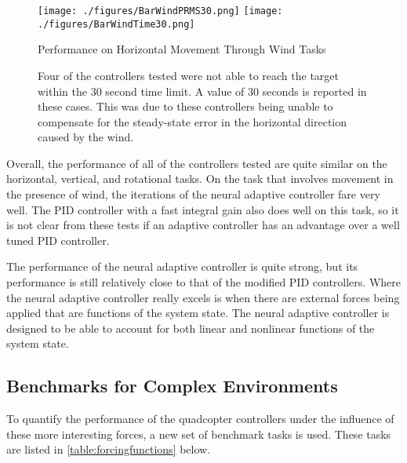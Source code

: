 \documentclass[letterpaper,12pt,titlepage,oneside,final]{book}
\begin{document}
\begin{figure}
\centering
\texttt{[image: ./figures/BarWindPRMS30.png]}
\texttt{[image: ./figures/BarWindTime30.png]}
\caption{Performance on Horizontal Movement Through Wind Tasks}\label{fig:bar_wind}
\captionsetup{singlelinecheck=off,font=footnotesize}
\caption*{
Four of the controllers tested were not able to reach the target within the 30 second time limit. A value of 30 seconds is reported in these cases. This was due to these controllers being unable to compensate for the steady-state error in the horizontal direction caused by the wind.
}
\end{figure}




Overall, the performance of all of the controllers tested are quite similar on the horizontal, vertical, and rotational tasks.
On the task that involves movement in the presence of wind, the iterations of the neural adaptive controller fare very well.
The PID controller with a fast integral gain also does well on this task, so it is not clear from these tests if an adaptive controller has an advantage over a well tuned PID controller.

The performance of the neural adaptive controller is quite strong, but its performance is still relatively close to that of the modified PID controllers. 
Where the neural adaptive controller really excels is when there are external forces being applied that are functions of the system state. 
The neural adaptive controller is designed to be able to account for both linear and nonlinear functions of the system state.

\subsection{Benchmarks for Complex Environments}

To quantify the performance of the quadcopter controllers under the influence of these more interesting forces, a new set of benchmark tasks is used.
These tasks are listed in \autoref{table:forcingfunctions} below. %
\end{document}
